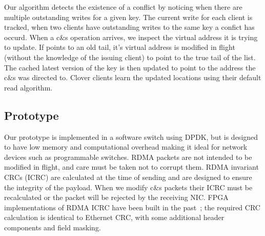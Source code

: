   Our algorithm detects the existence of a conflict by noticing when
  there are multiple outstanding writes for a given key. The current
  write for each client is tracked, when two clients have outstanding
  writes to the same key a confict has occurd. When a c\&s operation
  arrives, we inspect the virtual address it is trying to update.  If
  points to an old tail, it's virtual address is modified in flight
  (without the knowledge of the issuing client) to point to the true
  tail of the list. The cached latest version of the key is then
  updated to point to the address the c\&s was directed to.  Clover
  clients learn the updated locations using their default read
  algorithm.

\subsection{Prototype}

Our prototype is implemented in a software switch using DPDK, but is
designed to have low memory and computational overhead making it ideal
for network devices such as programmable switches.  RDMA packets are
not intended to be modified in flight, and care must be taken not to
corrupt them. RDMA invariant CRCs (ICRC) are calculated at the time of
sending and are designed to ensure the integrity of the payload. When
we modify c\&s packets their ICRC must be recalculated or the packet
will be rejected by the receiving NIC. FPGA implementations of RDMA
ICRC have been built in the past~\cite{Mansour_2019}; the required CRC
calculation is identical to Ethernet CRC, with some additional header
components and field masking.


